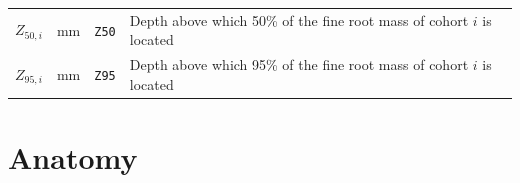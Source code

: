 \documentclass[]{book}
\begin{document}
\begin{longtable}[]{@{}llll@{}}
\begin{minipage}[t]{0.11\columnwidth}
\(Z_{50,i}\)\strut
\end{minipage} & \begin{minipage}[t]{0.10\columnwidth}\raggedright
mm\strut
\end{minipage} & \begin{minipage}[t]{0.12\columnwidth}\raggedright
\texttt{Z50}\strut
\end{minipage} & \begin{minipage}[t]{0.45\columnwidth}\raggedright
Depth above which 50\% of the fine root mass of cohort \(i\) is located\strut
\end{minipage}\tabularnewline
\begin{minipage}[t]{0.11\columnwidth}\raggedright
\(Z_{95,i}\)\strut
\end{minipage} & \begin{minipage}[t]{0.10\columnwidth}\raggedright
mm\strut
\end{minipage} & \begin{minipage}[t]{0.12\columnwidth}\raggedright
\texttt{Z95}\strut
\end{minipage} & \begin{minipage}[t]{0.45\columnwidth}\raggedright
Depth above which 95\% of the fine root mass of cohort \(i\) is located\strut
\end{minipage}\tabularnewline
\bottomrule
\end{longtable}

\hypertarget{anatomy}{%
\section{Anatomy}\label{anatomy}}
\end{document}
